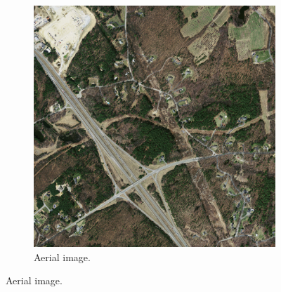 \begin{figure}
\begin{subfigure}{0.48\textwidth}
\includegraphics[width=\textwidth]{figs/E6/E6-image.jpg}
\caption{Aerial image.} \label{fig:E6_aerial_image}
\vspace{0.5cm} %
\end{subfigure}


\end{figure}

